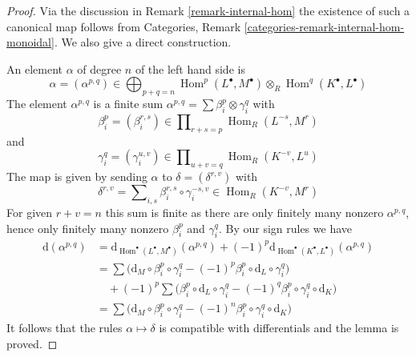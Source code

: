 \documentclass[10pt,a4paper]{amsart}
\theoremstyle{plain}
\theoremstyle{definition}
\theoremstyle{remark}
\numberwithin{equation}{subsection}
\def\Hom{\mathop{\mathrm{Hom}}\nolimits}
\begin{document}
\begin{proof}
Via the discussion in Remark \ref{remark-internal-hom} the existence
of such a canonical map follows from
Categories, Remark \ref{categories-remark-internal-hom-monoidal}.
We also give a direct construction.

\medskip\noindent
An element $\alpha$ of degree $n$ of the left hand side is
$$
\alpha = (\alpha^{p, q}) \in \bigoplus\nolimits_{p + q = n}
\Hom^p(L^\bullet, M^\bullet) \otimes_R \Hom^q(K^\bullet, L^\bullet)
$$
The element $\alpha^{p, q}$ is a finite sum
$\alpha^{p, q} = \sum \beta^p_i \otimes \gamma^q_i$
with
$$
\beta^p_i = (\beta^{r, s}_i)
\in \prod\nolimits_{r + s = p} \Hom_R(L^{-s}, M^r)
$$
and
$$
\gamma^q_i = (\gamma^{u, v}_i)
\in \prod\nolimits_{u + v = q} \Hom_R(K^{-v}, L^u)
$$
The map is given by sending $\alpha$ to
$\delta = (\delta^{r, v})$ with
$$
\delta^{r, v} =
\sum\nolimits_{i, s}  \beta^{r, s}_i
\circ \gamma^{-s, v}_i
\in \Hom_R(K^{-v}, M^r)
$$
For given $r + v = n$ this sum is finite as there are only finitely many
nonzero $\alpha^{p, q}$, hence only finitely many nonzero
$\beta^p_i$ and $\gamma^q_i$.
By our sign rules we have
\begin{align*}
\text{d}(\alpha^{p, q})
& =
\text{d}_{\Hom^\bullet(L^\bullet, M^\bullet)}(\alpha^{p, q})
+ (-1)^p \text{d}_{\Hom^\bullet(K^\bullet, L^\bullet)}(\alpha^{p, q}) \\
& =
\sum \Big( \text{d}_M \circ \beta^p_i \circ \gamma^q_i
- (-1)^p \beta^p_i \circ \text{d}_L \circ \gamma^q_i \Big) \\
&
\quad + (-1)^p \sum \Big( \beta^p_i \circ \text{d}_L \circ \gamma^q_i
- (-1)^q \beta^p_i \circ \gamma^q_i \circ \text{d}_K \Big) \\
& =
\sum \Big( \text{d}_M \circ \beta^p_i \circ \gamma^q_i 
-(-1)^n \beta^p_i \circ \gamma^q_i \circ \text{d}_K \Big)
\end{align*}
It follows that the rules $\alpha \mapsto \delta$ is compatible
with differentials and the lemma is proved.
\end{proof}
\end{document}
